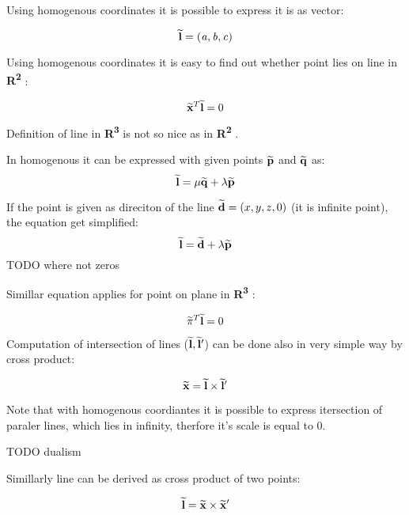 \documentclass[a4paper,12pt]{report}
\newcommand{\ehvect}[1]{
{\bf \widetilde{#1}}
}
\newcommand{\escal}[1]{
{\it #1}
}
\newcommand{\eucl}[1]{
{\bf R\textsuperscript{#1}}
}
\begin{document}
Using homogenous coordinates it is possible to express it is as vector:

\begin{equation}
\ehvect{l} =  (\escal{a}, \escal{b}, \escal{c})
\end{equation}

Using homogenous coordinates it is easy to find out whether point lies on line in \eucl{2}:

\begin{equation}
\ehvect{x}^{T} \ehvect{l} = 0
\end{equation}


Definition of line in \eucl{3} is not so nice as in \eucl{2}.



In homogenous it can be expressed with given points $\ehvect{p}$ and $\ehvect{q}$ as:
\begin{equation}
 \ehvect{l} = \escal{\mu}\ehvect{q} + \escal{\lambda}\ehvect{p}
\end{equation}

If the point is given as direciton of the line $\ehvect{d} = (x, y, z, 0)$ (it is infinite point), the equation get simplified:
\begin{equation}
\ehvect{l} = \ehvect{d} + \escal{\lambda}\ehvect{p} \label{eq:hline}
\end{equation}
TODO where not zeros

Simillar equation applies for point on plane in \eucl{3}:

\begin{equation}
\ehvect{\pi}^{T} \ehvect{l} = 0
\end{equation}

Computation of intersection of lines ($\ehvect{l}, \ehvect{l}'$) can be done also in very simple way by cross product:

\begin{equation}
\ehvect{x} = \ehvect{l} \times \ehvect{l}' \label{eq:def_hline_pts}
\end{equation}


Note that with homogenous coordiantes it is possible to express itersection of paraler lines, which lies in infinity, 
therfore it's scale is equal to 0.

TODO dualism

Simillarly line can be derived as cross product of two points:

\begin{equation}
\ehvect{l} = \ehvect{x} \times \ehvect{x}'
\end{equation}
\end{document}
